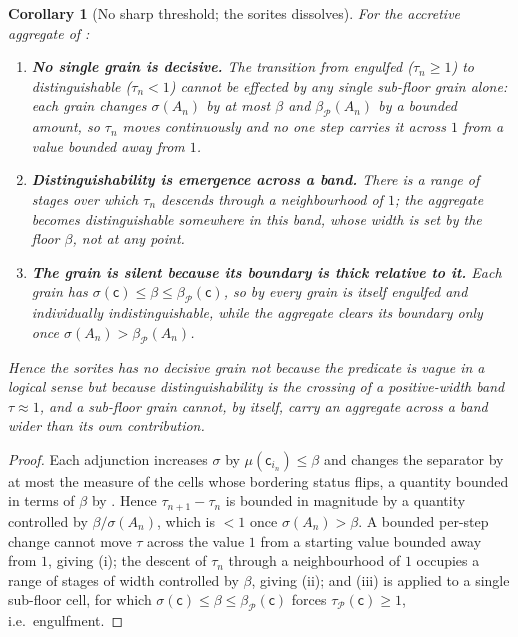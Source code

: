 \documentclass[11pt,a4paper]{article}
\theoremstyle{thmstyle}
\newtheorem{corollary}[theorem]{Corollary}
\theoremstyle{definition}
\theoremstyle{remark}
\newcommand{\thick}{\beta}
\newcommand{\Part}{\mathscr{P}}
\newcommand{\cell}{\mathsf{c}}
\begin{document}
\begin{corollary}[No sharp threshold; the sorites dissolves]
\label{cor:sorites}
For the accretive aggregate of :
\begin{enumerate}[label=\textup{(\roman*)},leftmargin=2.2em]
\item \textbf{No single grain is decisive.} The transition from engulfed
\textup{(}$\tau_n\ge1$\textup{)} to distinguishable \textup{(}$\tau_n<1$\textup{)}
cannot be effected by any single sub-floor grain alone: each grain changes
$\sigma(A_n)$ by at most $\thick$ and $\thick_\Part(A_n)$ by a bounded amount, so
$\tau_n$ moves continuously and no one step carries it across $1$ from a value
bounded away from $1$.
\item \textbf{Distinguishability is emergence across a band.} There is a range of
stages over which $\tau_n$ descends through a neighbourhood of $1$; the aggregate
becomes distinguishable somewhere in this band, whose width is set by the floor
$\thick$, not at any point.
\item \textbf{The grain is silent because its boundary is thick relative to it.}
Each grain has $\sigma(\cell)\le\thick\le\thick_\Part(\cell)$, so by
 every grain is itself engulfed and individually
indistinguishable, while the aggregate clears its boundary only once
$\sigma(A_n)>\thick_\Part(A_n)$.
\end{enumerate}
Hence the sorites has no decisive grain not because the predicate is vague in a
logical sense but because distinguishability is the crossing of a positive-width
band $\tau\approx1$, and a sub-floor grain cannot, by itself, carry an aggregate
across a band wider than its own contribution.
\end{corollary}

\begin{proof}
Each adjunction increases $\sigma$ by $\mu(\cell_{i_n})\le\thick$ and changes the
separator by at most the measure of the cells whose bordering status flips, a
quantity bounded in terms of $\thick$ by . Hence
$\tau_{n+1}-\tau_n$ is bounded in magnitude by a quantity controlled by
$\thick/\sigma(A_n)$, which is $<1$ once $\sigma(A_n)>\thick$. A bounded
per-step change cannot move $\tau$ across the value $1$ from a starting value
bounded away from $1$, giving (i); the descent of $\tau_n$ through a
neighbourhood of $1$ occupies a range of stages of width controlled by $\thick$,
giving (ii); and (iii) is  applied to a single
sub-floor cell, for which $\sigma(\cell)\le\thick\le\thick_\Part(\cell)$ forces
$\tau_\Part(\cell)\ge1$, i.e.\ engulfment.
\end{proof}
\end{document}
